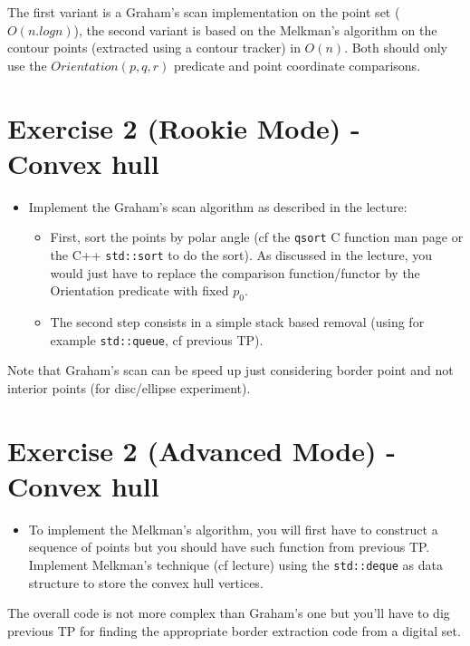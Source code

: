 \documentclass[a4paper, 11pt]{article}
\begin{document}
\par The first variant is a Graham's scan implementation on the point set ($O(n.logn)$), the second variant is based on the Melkman's algorithm on the contour points (extracted using a contour tracker) in $O(n)$. Both should only use the $Orientation(p,q,r)$ predicate and point coordinate comparisons.


\section*{Exercise 2 (Rookie Mode) - \rm Convex hull}

\begin{itemize}
	\item Implement the Graham's scan algorithm as described in the lecture:
		\begin{itemize}
		\item First, sort the points by polar angle (cf the \texttt{qsort} C function man page  or the C++ \texttt{std::sort} to do the sort). As discussed in the lecture, you would just have to replace the comparison function/functor by the Orientation predicate with fixed $p_0$.
		\item The second step consists in a simple stack based removal (using for example \texttt{std::queue}, cf previous TP).
		\end{itemize}
\end{itemize}

\par Note that Graham's scan can be speed up just considering border point and not interior points (for disc/ellipse experiment).


\section*{Exercise 2 (Advanced Mode) - \rm Convex hull}

\begin{itemize}
	\item To implement the Melkman's algorithm, you will first have to construct a sequence of points but you should have such function from previous TP. Implement Melkman's technique (cf lecture) using the \texttt{std::deque} as data structure to store the convex hull vertices.
\end{itemize}

\par The overall code is not more complex than Graham's one but you'll have to dig previous TP for finding the appropriate border extraction code from a digital set.
\end{document}
